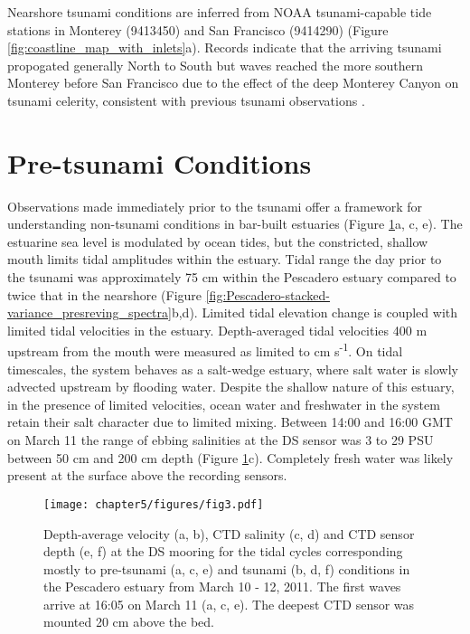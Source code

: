 Nearshore tsunami conditions are inferred from NOAA tsunami-capable
tide stations in Monterey (9413450) and San Francisco (9414290) (Figure
\ref{fig:coastline_map_with_inlets}a). Records indicate that the
arriving tsunami propogated generally North to South but waves reached
the more southern Monterey before San Francisco due to the effect
of the deep Monterey Canyon on tsunami celerity, consistent with previous
tsunami observations \citep{Gonzalez_ea_1995}. 


\section{Pre-tsunami Conditions}

Observations made immediately prior to the tsunami offer a framework
for understanding non-tsunami conditions in bar-built estuaries (Figure
\ref{fig:Station-DS-CTD_stack}a, c, e). The estuarine sea level is
modulated by ocean tides, but the constricted, shallow mouth limits
tidal amplitudes within the estuary. Tidal range the day prior to
the tsunami was approximately 75 cm within the Pescadero estuary compared
to twice that in the nearshore (Figure \ref{fig:Pescadero-stacked-variance_presreving_spectra}b,d).
Limited tidal elevation change is coupled with limited tidal velocities
in the estuary. Depth-averaged tidal velocities 400 m upstream from
the mouth were measured as limited to  cm s\textsuperscript{-1}.
On tidal timescales, the system behaves as a salt-wedge estuary, where
salt water is slowly advected upstream by flooding water. Despite
the shallow nature of this estuary, in the presence of limited velocities,
ocean water and freshwater in the system retain their salt character
due to limited mixing. Between 14:00 and 16:00 GMT on March 11 the
range of ebbing salinities at the DS sensor was 3 to 29 PSU between
50 cm and 200 cm depth (Figure \ref{fig:Station-DS-CTD_stack}c).
Completely fresh water was likely present at the surface above the
recording sensors. 



\begin{figure}
\texttt{[image: chapter5/figures/fig3.pdf]}

\protect\caption{Depth-average velocity (a, b), CTD salinity (c, d) and CTD sensor
depth (e, f) at the DS mooring for the tidal cycles corresponding
mostly to pre-tsunami (a, c, e) and tsunami (b, d, f) conditions in
the Pescadero estuary from March 10 - 12, 2011. The first waves arrive
at 16:05 on March 11 (a, c, e). The deepest CTD sensor was mounted
20 cm above the bed. \label{fig:Station-DS-CTD_stack}}
\end{figure}

